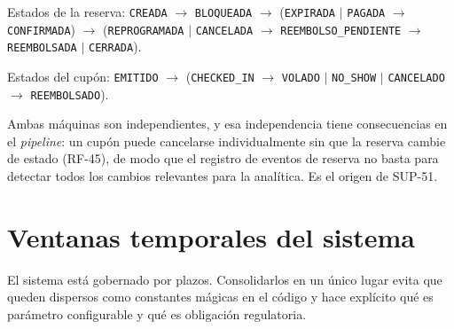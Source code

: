 \documentclass[10pt,letterpaper]{article}
\begin{document}
Estados de la reserva: \texttt{CREADA} $\rightarrow$ \texttt{BLOQUEADA} $\rightarrow$ (\texttt{EXPIRADA} $\mid$ \texttt{PAGADA} $\rightarrow$ \texttt{CONFIRMADA}) $\rightarrow$ (\texttt{REPROGRAMADA} $\mid$ \texttt{CANCELADA} $\rightarrow$ \texttt{REEMBOLSO\_PENDIENTE} $\rightarrow$ \texttt{REEMBOLSADA} $\mid$ \texttt{CERRADA}).

Estados del cupón: \texttt{EMITIDO} $\rightarrow$ (\texttt{CHECKED\_IN} $\rightarrow$ \texttt{VOLADO} $\mid$ \texttt{NO\_SHOW} $\mid$ \texttt{CANCELADO} $\rightarrow$ \texttt{REEMBOLSADO}).

Ambas máquinas son independientes, y esa independencia tiene consecuencias en el \emph{pipeline}: un cupón puede cancelarse individualmente sin que la reserva cambie de estado (RF-45), de modo que el registro de eventos de reserva no basta para detectar todos los cambios relevantes para la analítica. Es el origen de SUP-51.

\section{Ventanas temporales del sistema}
\label{sec:ventanas}

El sistema está gobernado por plazos. Consolidarlos en un único lugar evita que queden dispersos como constantes mágicas en el código y hace explícito qué es parámetro configurable y qué es obligación regulatoria.
\end{document}
